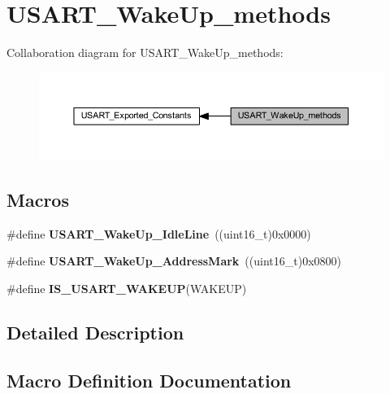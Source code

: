 \hypertarget{group___u_s_a_r_t___wake_up__methods}{}\section{U\+S\+A\+R\+T\+\_\+\+Wake\+Up\+\_\+methods}
\label{group___u_s_a_r_t___wake_up__methods}
Collaboration diagram for U\+S\+A\+R\+T\+\_\+\+Wake\+Up\+\_\+methods\+:\nopagebreak
\begin{figure}[H]
\begin{center}
\leavevmode
\includegraphics[width=350pt]{group___u_s_a_r_t___wake_up__methods}
\end{center}
\end{figure}
\subsection*{Macros}
\begin{DoxyCompactItemize}
\item 
\mbox{\label{group___u_s_a_r_t___wake_up__methods_ga9646d71590d5cef29ee12da0bb431d92}} 
\#define {\bfseries U\+S\+A\+R\+T\+\_\+\+Wake\+Up\+\_\+\+Idle\+Line}~((uint16\+\_\+t)0x0000)
\item 
\mbox{\label{group___u_s_a_r_t___wake_up__methods_ga9f63c1671060682adee91b9a2f3202e4}} 
\#define {\bfseries U\+S\+A\+R\+T\+\_\+\+Wake\+Up\+\_\+\+Address\+Mark}~((uint16\+\_\+t)0x0800)
\item 
\#define {\bfseries I\+S\+\_\+\+U\+S\+A\+R\+T\+\_\+\+W\+A\+K\+E\+UP}(W\+A\+K\+E\+UP)
\end{DoxyCompactItemize}


\subsection{Detailed Description}


\subsection{Macro Definition Documentation}
\mbox{\label{group___u_s_a_r_t___wake_up__methods_ga3611be417bdb82f42dc2ca17584271f9}} 
